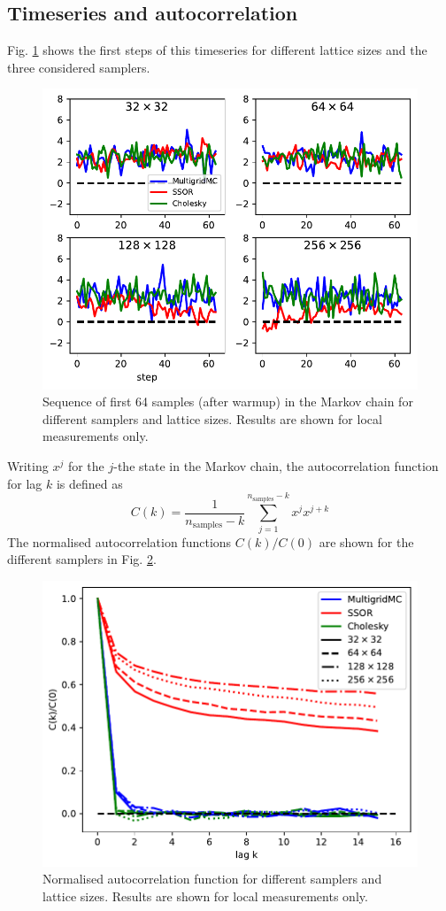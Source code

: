 \documentclass[11pt]{article}
\begin{document}
\subsection{Timeseries and autocorrelation}
Fig. \ref{fig:timeseries} shows the first steps of this timeseries for different lattice sizes and the three considered samplers.
\begin{figure}
    \begin{center}
        \includegraphics[width=0.7\linewidth]{timeseries.pdf}
        \caption{Sequence of first 64 samples (after warmup) in the Markov chain for different samplers and lattice sizes. Results are shown for local measurements only.}
        \label{fig:timeseries}
    \end{center}
\end{figure}
Writing $x^j$ for the $j$-the state in the Markov chain, the autocorrelation function for lag $k$ is defined as
\begin{equation}
    C(k) = \frac{1}{n_{\text{samples}}-k}\sum_{j=1}^{n_\text{samples}-k} x^{j} x^{j+k}
\end{equation}
The normalised autocorrelation functions $C(k)/C(0)$ are shown for the different samplers in Fig. \ref{fig:autocorrelation}.
\begin{figure}
    \begin{center}
        \includegraphics[width=0.7\linewidth]{autocorrelation.pdf}
        \caption{Normalised autocorrelation function for different samplers and lattice sizes. Results are shown for local measurements only.}
        \label{fig:autocorrelation}
    \end{center}
\end{figure}
\end{document}
